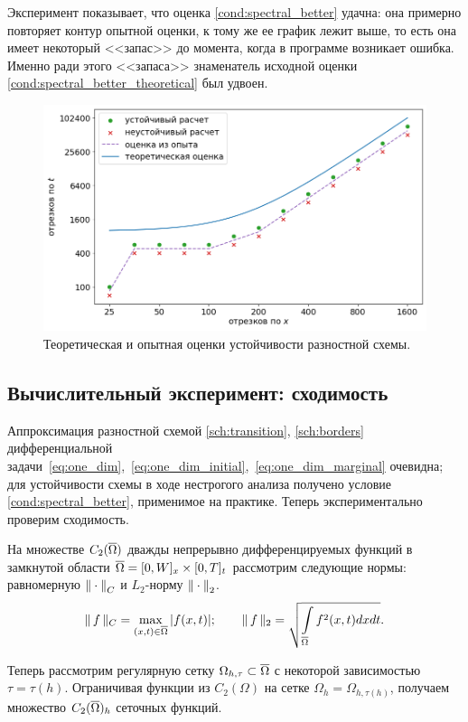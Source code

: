 Эксперимент показывает, что оценка \eqref{cond:spectral_better} удачна: она примерно повторяет контур опытной оценки, к тому же ее график лежит выше, то есть она имеет некоторый <<запас>> до момента, когда в программе возникает ошибка. Именно ради этого <<запаса>> знаменатель исходной оценки  \eqref{cond:spectral_better_theoretical} был удвоен.

\begin{figure}[!t]
	\centering
	\includegraphics[width=\textwidth]{figures/stability_bounds.png}
	\vspace{-0.7cm}
	\caption{Теоретическая и опытная оценки устойчивости разностной схемы.}
	\label{fig:stability_bounds}
\end{figure}


\subsection{Вычислительный эксперимент: сходимость}

Аппроксимация разностной схемой \eqref{sch:transition}, \eqref{sch:borders} дифференциальной задачи~\eqref{eq:one_dim},~\eqref{eq:one_dim_initial},~\eqref{eq:one_dim_marginal} очевидна; для устойчивости схемы в ходе нестрогого анализа получено условие \eqref{cond:spectral_better}, применимое на практике. Теперь экспериментально проверим сходимость.

На множестве $C_2({\overline{\Omega}})$ дважды непрерывно дифференцируемых функций в замкнутой области ${\overline{\Omega}} = [0, W]_x \times [0, T]_t$ рассмотрим следующие нормы: равномерную ${\| \cdot \|}_C$ и $L_2$-норму ${\| \cdot \|}_2$.
$$\| \, f \, \|_C = \max \limits_{(x, t) \in {\overline{\Omega}}} |f(x, t)|; \qquad \| \, f \, \|_2 = \sqrt{\int \limits_{{\overline{\Omega}}} f^2(x, t) dx dt} {\text{.}}$$

Теперь рассмотрим регулярную сетку $\Omega_{h, \tau} \subset {\overline{\Omega}}$ с некоторой зависимостью $\tau = \tau(h)$. Ограничивая функции из $C_2(\Omega)$ на сетке $\Omega_h = \Omega_{h, \tau(h)}$, получаем множество $C_2({\overline{\Omega}})_h$ сеточных функций.

